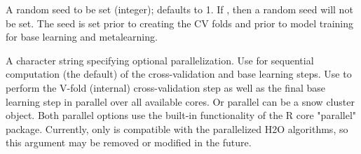 \documentclass[a4paper]{book}
\begin{document}
\begin{Arguments}
\begin{ldescription}
\item[\code{seed}] 
A random seed to be set (integer); defaults to 1. If , then a random seed will not be set.  The seed is set prior to creating the CV folds and prior to model training for base learning and metalearning.

\item[\code{parallel}] 
A character string specifying optional parallelization. Use  for sequential computation (the default) of the cross-validation and base learning steps. Use  to perform the V-fold (internal) cross-validation step as well as the final base learning step in parallel over all available cores. Or parallel can be a snow cluster object. Both parallel options use the built-in functionality of the R core "parallel" package.  Currently, only  is compatible with the parallelized H2O algorithms, so this argument may be removed or modified in the future.

\end{ldescription}
\end{Arguments}
%
\end{document}
